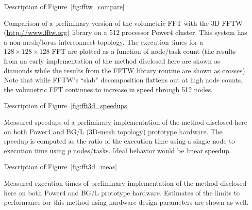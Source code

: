 \documentclass[pdftex,finalversion,simpleeqnnos,titlepage,12pt]{article}
\begin{document}
\newpage %

Description of Figure~\ref{fig:fftw_compare}

Comparison of a preliminary version of the volumetric FFT with the
3D-FFTW (\url{http://www.fftw.org}) library on a 512 processor Power4
cluster.  This system has a non-mesh/torus interconnect topology.  The
execution times for a $128\times 128\times 128$ FFT are plotted as a
function of node/task count (the results from an early implementation
of the method disclosed here are shown as diamonds while the results
from the FFTW library routine are shown as crosses).  Note that while
FFTW's ``slab'' decomposition flattens out at high node counts, the
volumetric FFT continues to increase in speed through 512 nodes.

\newpage %

Description of Figure~\ref{fig:fft3d_speedups}

Measured speedups of a preliminary implementation of the method
disclosed here on both Power4 and BG/L (3D-mesh topology) prototype
hardware.  The speedup is computed as the ratio of the execution time
using a single node to execution time using $p$ nodes/tasks.  Ideal
behavior would be linear speedup.

\newpage %

Description of Figure~\ref{fig:fft3d_meas}

Measured execution times of preliminary implementation of the method
disclosed here on both Power4 and BG/L prototype hardware.  Estimates
of the limits to performance for this method using hardware design
parameters are shown as well.


\newpage

\end{document}
